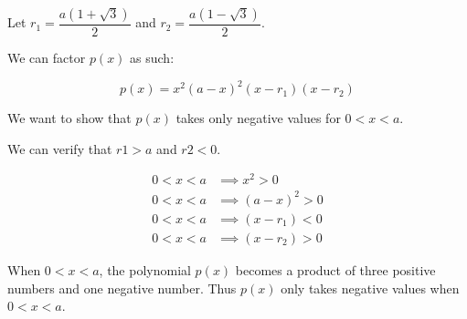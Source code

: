 Let $r_1 = \dfrac{a(1 + \sqrt{3})}{2}$ and $r_2 = \dfrac{a(1 - \sqrt{3})}{2}$.

We can factor $p(x)$ as such:

$$p(x) = x^2 (a-x)^2 (x - r_1) (x - r_2)$$

We want to show that $p(x)$ takes only negative values for $0 < x < a$.

We can verify that $r1 > a$ and $r2 < 0$.

\begin{align*}
0 < x < a &\implies x^2 > 0 \\ 
0 < x < a &\implies (a - x)^2 > 0 \\
0 < x < a &\implies (x - r_1) < 0 \\ 
0 < x < a &\implies (x - r_2) > 0
\end{align*}

When $0 < x < a$, the polynomial $p(x)$ becomes a product of three positive numbers and one negative number. Thus $p(x)$ only takes negative values when $0 < x < a$.
